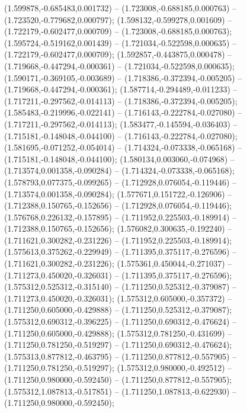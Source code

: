  (1.599878,-0.685483,0.001732) -- (1.723008,-0.688185,0.000763) -- (1.723520,-0.779682,0.000797);
 (1.598132,-0.599278,0.001609) -- (1.722179,-0.602477,0.000709) -- (1.723008,-0.688185,0.000763);
 (1.595724,-0.519162,0.001439) -- (1.721034,-0.522598,0.000635) -- (1.722179,-0.602477,0.000709);
 (1.592857,-0.443875,0.000478) -- (1.719668,-0.447294,-0.000361) -- (1.721034,-0.522598,0.000635);
 (1.590171,-0.369105,-0.003689) -- (1.718386,-0.372394,-0.005205) -- (1.719668,-0.447294,-0.000361);
 (1.587714,-0.294489,-0.011233) -- (1.717211,-0.297562,-0.014113) -- (1.718386,-0.372394,-0.005205);
 (1.585483,-0.219996,-0.022141) -- (1.716143,-0.222784,-0.027080) -- (1.717211,-0.297562,-0.014113);
 (1.583477,-0.145594,-0.036403) -- (1.715181,-0.148048,-0.044100) -- (1.716143,-0.222784,-0.027080);
 (1.581695,-0.071252,-0.054014) -- (1.714324,-0.073338,-0.065168) -- (1.715181,-0.148048,-0.044100);
 (1.580134,0.003060,-0.074968) -- (1.713574,0.001358,-0.090284) -- (1.714324,-0.073338,-0.065168);
 (1.578793,0.077375,-0.099265) -- (1.712928,0.076054,-0.119446) -- (1.713574,0.001358,-0.090284);
 (1.577671,0.151722,-0.126906) -- (1.712388,0.150765,-0.152656) -- (1.712928,0.076054,-0.119446);
 (1.576768,0.226132,-0.157895) -- (1.711952,0.225503,-0.189914) -- (1.712388,0.150765,-0.152656);
 (1.576082,0.300635,-0.192240) -- (1.711621,0.300282,-0.231226) -- (1.711952,0.225503,-0.189914);
 (1.575613,0.375262,-0.229949) -- (1.711395,0.375117,-0.276596) -- (1.711621,0.300282,-0.231226);
 (1.575361,0.450044,-0.271037) -- (1.711273,0.450020,-0.326031) -- (1.711395,0.375117,-0.276596);
 (1.575312,0.525312,-0.315140) -- (1.711250,0.525312,-0.379087) -- (1.711273,0.450020,-0.326031);
 (1.575312,0.605000,-0.357372) -- (1.711250,0.605000,-0.429888) -- (1.711250,0.525312,-0.379087);
 (1.575312,0.690312,-0.396225) -- (1.711250,0.690312,-0.476624) -- (1.711250,0.605000,-0.429888);
 (1.575312,0.781250,-0.431699) -- (1.711250,0.781250,-0.519297) -- (1.711250,0.690312,-0.476624);
 (1.575313,0.877812,-0.463795) -- (1.711250,0.877812,-0.557905) -- (1.711250,0.781250,-0.519297);
 (1.575312,0.980000,-0.492512) -- (1.711250,0.980000,-0.592450) -- (1.711250,0.877812,-0.557905);
 (1.575312,1.087813,-0.517851) -- (1.711250,1.087813,-0.622930) -- (1.711250,0.980000,-0.592450);
